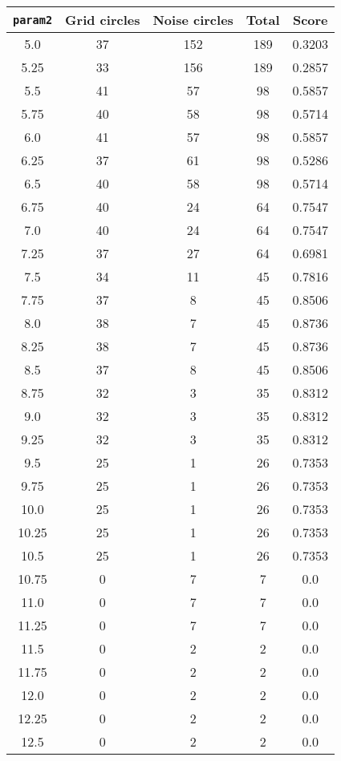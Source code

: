 \documentclass[letterpaper, 12pt]{article}
\begin{document}
\begin{longtable}{|c|c|c|c|c|}
\hline
\textbf{\texttt{param2}} & \textbf{Grid circles} & \textbf{Noise circles} & \textbf{Total} & \textbf{Score} \\
\hline
5.0 & 37 & 152 & 189 & 0.3203 \\
\hline
5.25 & 33 & 156 & 189 & 0.2857 \\
\hline
5.5 & 41 & 57 & 98 & 0.5857 \\
\hline
5.75 & 40 & 58 & 98 & 0.5714 \\
\hline
6.0 & 41 & 57 & 98 & 0.5857 \\
\hline
6.25 & 37 & 61 & 98 & 0.5286 \\
\hline
6.5 & 40 & 58 & 98 & 0.5714 \\
\hline
6.75 & 40 & 24 & 64 & 0.7547 \\
\hline
7.0 & 40 & 24 & 64 & 0.7547 \\
\hline
7.25 & 37 & 27 & 64 & 0.6981 \\
\hline
7.5 & 34 & 11 & 45 & 0.7816 \\
\hline
7.75 & 37 & 8 & 45 & 0.8506 \\
\hline
8.0 & 38 & 7 & 45 & 0.8736 \\
\hline
8.25 & 38 & 7 & 45 & 0.8736 \\
\hline
8.5 & 37 & 8 & 45 & 0.8506 \\
\hline
8.75 & 32 & 3 & 35 & 0.8312 \\
\hline
9.0 & 32 & 3 & 35 & 0.8312 \\
\hline
9.25 & 32 & 3 & 35 & 0.8312 \\
\hline
9.5 & 25 & 1 & 26 & 0.7353 \\
\hline
9.75 & 25 & 1 & 26 & 0.7353 \\
\hline
10.0 & 25 & 1 & 26 & 0.7353 \\
\hline
10.25 & 25 & 1 & 26 & 0.7353 \\
\hline
10.5 & 25 & 1 & 26 & 0.7353 \\
\hline
10.75 & 0 & 7 & 7 & 0.0 \\
\hline
11.0 & 0 & 7 & 7 & 0.0 \\
\hline
11.25 & 0 & 7 & 7 & 0.0 \\
\hline
11.5 & 0 & 2 & 2 & 0.0 \\
\hline
11.75 & 0 & 2 & 2 & 0.0 \\
\hline
12.0 & 0 & 2 & 2 & 0.0 \\
\hline
12.25 & 0 & 2 & 2 & 0.0 \\
\hline
12.5 & 0 & 2 & 2 & 0.0 \\

\end{longtable}
\end{document}
